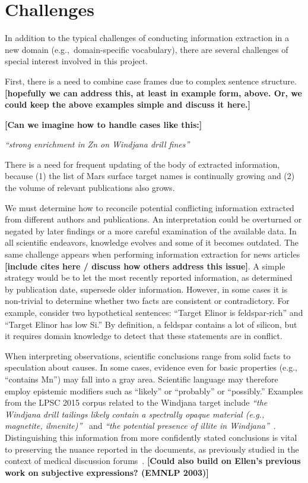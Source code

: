 \documentclass[letterpaper]{article}
\begin{document}
\section{Challenges}

In addition to the typical challenges of conducting information
extraction in a new domain (e.g.,~domain-specific vocabulary), there
are several challenges of special interest involved in this project.

First, there is a need to combine case frames due to complex sentence
structure.  {\bf [hopefully we can address this, at least in example
form, above.  Or, we could keep the above examples simple and discuss
it here.]}

{\bf [Can we imagine how to handle cases like this:]} 

{\em``strong enrichment in Zn on Windjana drill fines''}

There is a need for frequent updating of the body of extracted
information, because (1) the list of Mars surface target names is
continually growing and (2) the volume of relevant publications also
grows.  

We must determine how to reconcile potential conflicting information
extracted from different authors and publications.  An interpretation
could be overturned or negated by later findings or a more careful
examination of the available data.  In all scientific endeavors,
knowledge evolves and some of it becomes outdated.  The same challenge
appears when performing information extraction for news articles {\bf
[include cites here / discuss how others address this issue]}.
%
A simple strategy would be to let the most recently reported
information, as determined by publication date, supersede older
information.  However, in some cases it is non-trivial to determine
whether two facts are consistent or contradictory.  For example,
consider two hypothetical sentences: ``Target Elinor is
feldspar-rich'' and ``Target Elinor has low Si.''  By definition, a
feldspar contains a lot of silicon, but it requires domain knowledge
to detect that these statements are in conflict.

When interpreting observations, scientific conclusions range from
solid facts to speculation about causes.  In some cases, evidence even
for basic properties (e.g., ``contains Mn'') may fall into a gray
area.  Scientific language may therefore employ epistemic modifiers
such as ``likely'' or ``probably'' or ``possibly.''  Examples from the
LPSC 2015 corpus related to the Windjana target include {\em ``the Windjana
drill tailings likely contain a spectrally opaque material (e.g.,
magnetite, ilmenite)''}~\cite{johnson:ferric15} and {\em ``the potential
presence of illite in Windjana''}~\cite{rampe:cement15}.  Distinguishing
this information from more confidently stated conclusions is vital to
preserving the nuance reported in the documents, as previously studied
in the context of medical discussion forums~\cite{sokolova:epistemic13}.
%
{\bf [Could also build on Ellen's previous work on subjective
  expressions?  (EMNLP 2003)]}
\end{document}
